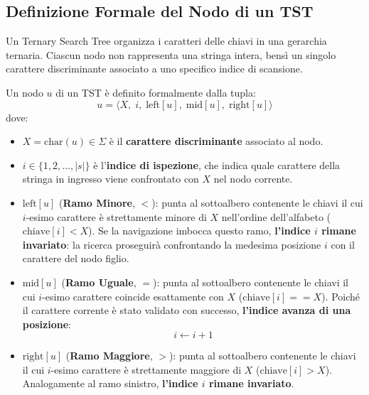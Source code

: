 \FloatBarrier
\subsection{Definizione Formale del Nodo di un TST}
\label{subsec:definizione-nodo-tst}

Un Ternary Search Tree organizza i caratteri delle chiavi in una gerarchia ternaria. Ciascun nodo non rappresenta una stringa intera, bens\`i un singolo carattere discriminante associato a uno specifico indice di scansione.

\begin{definition}
\label{def:nodo-tst}
Un nodo $u$ di un TST \`e definito formalmente dalla tupla:
\begin{equation}
  u = \langle X, \; i, \; \text{left}[u], \; \text{mid}[u], \; \text{right}[u] \rangle
\end{equation}
dove:
\begin{itemize}
  \item $X = \text{char}(u) \in \Sigma$ \`e il \textbf{carattere discriminante} associato al nodo.
  \item $i \in \{1, 2, \dots, |s|\}$ \`e l'\textbf{indice di ispezione}, che indica quale carattere della stringa in ingresso viene confrontato con $X$ nel nodo corrente.
  \item $\text{left}[u]$ (\textbf{Ramo Minore}, $<$): punta al sottoalbero contenente le chiavi il cui $i$-esimo carattere \`e strettamente minore di $X$ nell'ordine dell'alfabeto ($\text{chiave}[i] < X$). Se la navigazione imbocca questo ramo, \textbf{l'indice $i$ rimane invariato}: la ricerca proseguir\`a confrontando la medesima posizione $i$ con il carattere del nodo figlio.
  \item $\text{mid}[u]$ (\textbf{Ramo Uguale}, $=$): punta al sottoalbero contenente le chiavi il cui $i$-esimo carattere coincide esattamente con $X$ ($\text{chiave}[i] == X$). Poich\'e il carattere corrente \`e stato validato con successo, \textbf{l'indice avanza di una posizione}:
  \begin{equation}
    i \leftarrow i + 1
  \end{equation}
  \item $\text{right}[u]$ (\textbf{Ramo Maggiore}, $>$): punta al sottoalbero contenente le chiavi il cui $i$-esimo carattere \`e strettamente maggiore di $X$ ($\text{chiave}[i] > X$). Analogamente al ramo sinistro, \textbf{l'indice $i$ rimane invariato}.
\end{itemize}
\end{definition}

